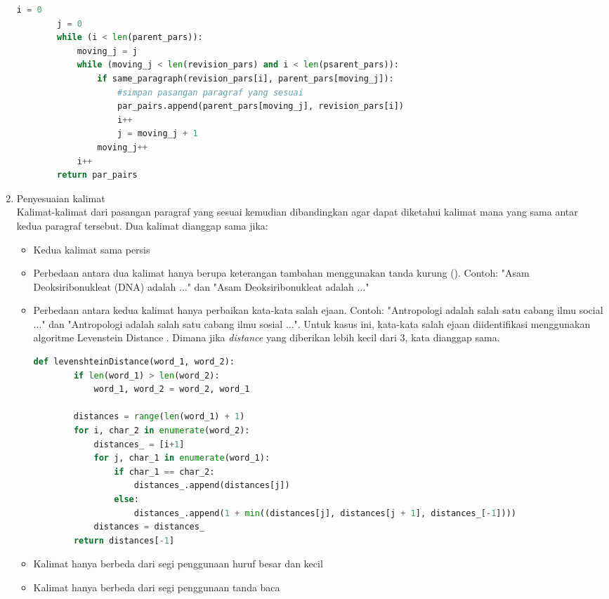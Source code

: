 \begin{enumerate}
\begin{lstlisting}[language=Python, caption={Penyesuaian paragraf}, label={kode-penyesuaian-par}]
		i = 0
		j = 0
		while (i < len(parent_pars)): 
			moving_j = j
			while (moving_j < len(revision_pars) and i < len(psarent_pars)):
				if same_paragraph(revision_pars[i], parent_pars[moving_j]):
					#simpan pasangan paragraf yang sesuai
					par_pairs.append(parent_pars[moving_j], revision_pars[i])
					i++
					j = moving_j + 1
				moving_j++
			i++
		return par_pairs
	\end{lstlisting}
	
	\item Penyesuaian kalimat\\
	Kalimat-kalimat dari pasangan paragraf yang sesuai kemudian dibandingkan agar dapat diketahui kalimat mana yang sama antar kedua paragraf tersebut. Dua kalimat dianggap sama jika:
	\begin{itemize}
		\item Kedua kalimat sama persis
		\item Perbedaan antara dua kalimat hanya berupa keterangan tambahan menggunakan tanda kurung (). Contoh: "Asam Deoksiribonukleat (DNA) adalah ..." dan "Asam Deoksiribonukleat adalah ..."
		\item Perbedaan antara kedua kalimat hanya perbaikan kata-kata salah ejaan. Contoh: "Antropologi adalah salah satu cabang ilmu social ..." dan "Antropologi adalah salah satu cabang ilmu sosial ...". Untuk kasus ini, kata-kata salah ejaan diidentifikasi menggunakan algoritme Levenstein Distance \citep{Levenshtein_SPD66}. Dimana jika \textit{distance} yang diberikan lebih kecil dari 3, kata dianggap sama.
		\begin{lstlisting}[language=Python, caption={Levenstein Distance}]
	def levenshteinDistance(word_1, word_2):
		if len(word_1) > len(word_2):
			word_1, word_2 = word_2, word_1
			
		distances = range(len(word_1) + 1)
		for i, char_2 in enumerate(word_2):
			distances_ = [i+1]
			for j, char_1 in enumerate(word_1):
				if char_1 == char_2:
					distances_.append(distances[j])
				else:
					distances_.append(1 + min((distances[j], distances[j + 1], distances_[-1])))
			distances = distances_
		return distances[-1]
		\end{lstlisting}
		\item Kalimat hanya berbeda dari segi penggunaan huruf besar dan kecil
		\item Kalimat hanya berbeda dari segi penggunaan tanda baca
	\end{itemize}
	

\end{enumerate}

